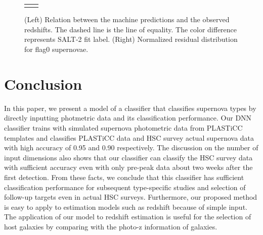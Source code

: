 \documentclass[useamsfonts]{pasj01}
\begin{document}
\begin{figure}[ht]
\begin{tabular}{cc}
\begin{minipage}{0.5\hsize}
\begin{center}
            \end{center}
        \end{minipage}
    \end{tabular}  \caption{%
    (Left) Relation between the machine predictions and the observed redshifts.
    The dashed line is the line of equality.
    The color difference represents SALT-2 fit label.
    (Right) Normalized residual distribution for flag0 supernovae.
    }%
    \label{fig:redshift_estimation}
\end{figure}
%
%
%
\section{Conclusion}
%
In this paper, we present a model of a classifier that classifies supernova types by directly inputting photmetric data and its classification performance.
Our DNN classifier trains with simulated supernova photometric data from PLASTiCC templates and classifies PLASTiCC data and HSC survey actual supernova data with high accuracy of 0.95 and 0.90 respectively.
The discussion on the number of input dimensions also shows that our classifier can classify the HSC survey data with sufficient accuracy even with only pre-peak data about two weeks after the first detection.
From these facts, we conclude that this classifier has sufficient classification performance for subsequent type-specific studies and selection of follow-up targets even in actual HSC surveys.
Furthermore, our proposed method is easy to apply to estimation models such as redshift because of simple input. The application of our model to redshift estimation is useful for the selection of host galaxies by comparing with the photo-z information of galaxies.
%
\end{document}

